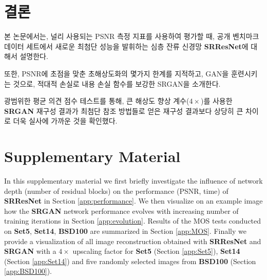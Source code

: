 \documentclass[10pt,twocolumn,letterpaper]{article}
\newcommand{\kor}[1]{#1}
\newcommand{\eng}[1]{}
\begin{document}
\section{\eng{Conclusion}\kor{결론}}
\label{sec:conclusion}
\eng{
We have described a deep residual network \textbf{SRResNet} that sets a new state of the art on public benchmark datasets when evaluated with the widely used \ac{PSNR} measure.
}\kor{
본 논문에서는, 널리 사용되는 \ac{PSNR} 측정 지표를 사용하여 평가할 때, 공개 벤치마크 데이터 세트에서 새로운 최첨단 성능을 발휘하는 심층 잔류 신경망 \textbf{SRResNet}에 대해서 설명한다.
} \eng{
We have highlighted some limitations of this \ac{PSNR}-focused image super-resolution and introduced \textbf{SRGAN}, which augments the content loss function with an adversarial loss by training a \ac{GAN}.
}\kor{
또한, \ac{PSNR}에 초점을 맞춘 초해상도화의 몇가지 한계를 지적하고, \ac{GAN}을 훈련시키는 것으로, 적대적 손실로 내용 손실 함수를 보강한 \ac{SRGAN}을 소개한다.
}\eng{
Using extensive \ac{MOS} testing, we have confirmed that \textbf{SRGAN} reconstructions for large upscaling factors ($4\times$) are, by a considerable margin, more photo-realistic than reconstructions obtained with state-of-the-art reference methods.
}\kor{
광범위한 \ac{평균 의견 점수} 테스트를 통해, 큰 해상도 향상 계수($4\times$)를 사용한 \textbf{SRGAN} 재구성 결과가 최첨단 참조 방법들로 얻은 재구성 결과보다 상당히 큰 차이로 더욱 실사에 가까운 것을 확인했다.
}

{\footnotesize


}
\clearpage
\setcounter{section}{0}
\renewcommand{\thesection}{\Alph{section}}
\onecolumn
\section{Supplementary Material}
In this supplementary material we first briefly investigate the influence of network depth (number of residual blocks) on the performance (PSNR, time) of \textbf{SRResNet} in Section \ref{app:performance}. We then visualize on an example image how the \textbf{SRGAN} network performance evolves with increasing number of training iterations in Section \ref{app:evolution}. Results of the \ac{MOS} tests conducted on \textbf{Set5}, \textbf{Set14}, \textbf{BSD100} are summarized in Section \ref{app:MOS}. Finally we provide a visualization of all image reconstruction obtained with \textbf{SRResNet} and \textbf{SRGAN} with a $4\times$ upscaling factor for \textbf{Set5} (Section \ref{app:Set5}), \textbf{Set14} (Section \ref{app:Set14}) and five randomly selected images from \textbf{BSD100} (Section \ref{app:BSD100}).\\
\end{document}
